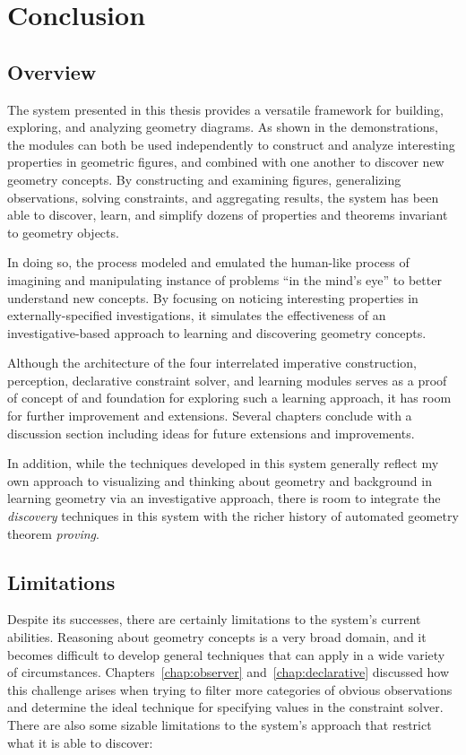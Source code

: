 \chapter{Conclusion}
\label{chap:conclusion}

\section{Overview}

The system presented in this thesis provides a versatile framework for
building, exploring, and analyzing geometry diagrams. As shown in the
demonstrations, the modules can both be used independently to
construct and analyze interesting properties in geometric figures, and
combined with one another to discover new geometry concepts. By
constructing and examining figures, generalizing observations,
solving constraints, and aggregating results, the system has been
able to discover, learn, and simplify dozens of properties and
theorems invariant to geometry objects.

In doing so, the process modeled and emulated the human-like process
of imagining and manipulating instance of problems ``in the mind's
eye'' to better understand new concepts. By focusing on noticing
interesting properties in externally-specified investigations, it
simulates the effectiveness of an investigative-based approach to
learning and discovering geometry concepts.

Although the architecture of the four interrelated imperative
construction, perception, declarative constraint solver, and learning
modules serves as a proof of concept of and foundation for exploring
such a learning approach, it has room for further improvement and
extensions. Several chapters conclude with a discussion section
including ideas for future extensions and improvements.

In addition, while the techniques developed in this system generally
reflect my own approach to visualizing and thinking about geometry and
background in learning geometry via an investigative approach, there
is room to integrate the \emph{discovery} techniques in this system
with the richer history of automated geometry theorem \emph{proving}.

\section{Limitations}

Despite its successes, there are certainly limitations to the system's
current abilities. Reasoning about geometry concepts is a very broad
domain, and it becomes difficult to develop general techniques that
can apply in a wide variety of circumstances.
Chapters~\ref{chap:observer} and~\ref{chap:declarative} discussed how
this challenge arises when trying to filter more categories of obvious
observations and determine the ideal technique for specifying values
in the constraint solver.  There are also some sizable limitations to
the system's approach that restrict what it is able to discover:

